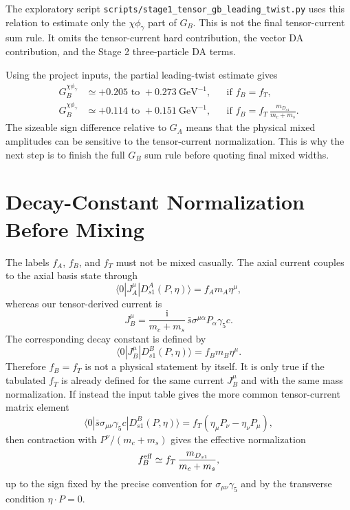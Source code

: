 \documentclass[11pt]{article}
\newcommand{\ii}{\mathrm{i}}
\begin{document}
The exploratory script
\texttt{scripts/stage1\_tensor\_gb\_leading\_twist.py} uses this relation to
estimate only the $\chi\phi_\gamma$ part of $G_B$.  This is not the final
tensor-current sum rule.  It omits the tensor-current hard contribution, the
vector DA contribution, and the Stage 2 three-particle DA terms.

Using the project inputs, the partial leading-twist estimate gives
\begin{align}
  G_B^{\chi\phi_\gamma}
  &\simeq +0.205\text{ to }+0.273\ \mathrm{GeV}^{-1},
  &&\text{if } f_B=f_T,\\
  G_B^{\chi\phi_\gamma}
  &\simeq +0.114\text{ to }+0.151\ \mathrm{GeV}^{-1},
  &&\text{if } f_B=f_T\,\frac{m_{D_{s1}}}{m_c+m_s}.
\end{align}
The sizeable sign difference relative to $G_A$ means that the physical mixed
amplitudes can be sensitive to the tensor-current normalization.  This is why
the next step is to finish the full $G_B$ sum rule before quoting final mixed
widths.

\section{Decay-Constant Normalization Before Mixing}

The labels $f_A$, $f_B$, and $f_T$ must not be mixed casually.  The axial
current couples to the axial basis state through
\begin{equation}
  \langle 0|J_A^\mu|D_{s1}^{A}(P,\eta)\rangle
  =
  f_A m_A \eta^\mu ,
\end{equation}
whereas our tensor-derived current is
\begin{equation}
  J_B^\mu
  =
  \frac{\ii}{m_c+m_s}\,
  \bar s\sigma^{\mu\alpha}P_\alpha\gamma_5 c .
\end{equation}
The corresponding decay constant is defined by
\begin{equation}
  \langle 0|J_B^\mu|D_{s1}^{B}(P,\eta)\rangle
  =
  f_B m_B \eta^\mu .
\end{equation}
Therefore $f_B=f_T$ is not a physical statement by itself.  It is only true if
the tabulated $f_T$ is already defined for the same current $J_B^\mu$ and with
the same mass normalization.  If instead the input table gives the more common
tensor-current matrix element
\begin{equation}
  \langle 0|\bar s\sigma_{\mu\nu}\gamma_5 c|D_{s1}^{B}(P,\eta)\rangle
  =
  f_T(\eta_\mu P_\nu-\eta_\nu P_\mu),
\end{equation}
then contraction with $P^\nu/(m_c+m_s)$ gives the effective normalization
\begin{equation}
  f_B^{\rm eff}
  \simeq
  f_T\,\frac{m_{D_{s1}}}{m_c+m_s},
\end{equation}
up to the sign fixed by the precise convention for
$\sigma_{\mu\nu}\gamma_5$ and by the transverse condition $\eta\cdot P=0$.
\end{document}
